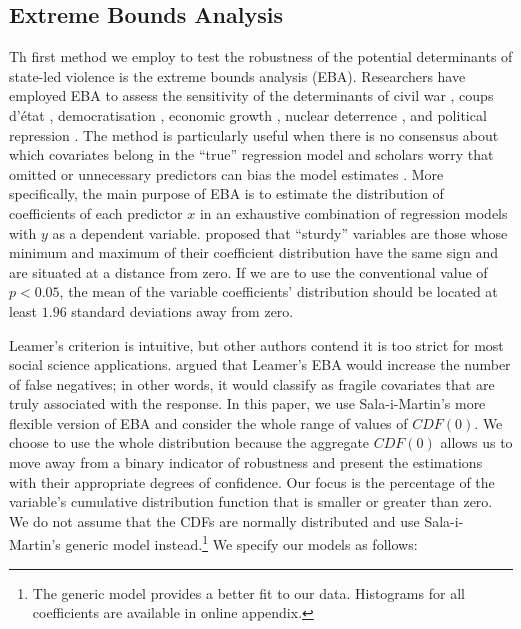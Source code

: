 \documentclass[a4paper,12pt]{article}
\begin{document}
\subsection{Extreme Bounds Analysis}
\label{subsec:eba}

Th first method we employ to test the robustness of the potential determinants of state-led violence is the extreme bounds analysis (EBA). Researchers have employed EBA to assess the sensitivity of the determinants of civil war \citep{hegre2006sensitivity}, coups d'état \citep{gassebner2016expect}, democratisation \citep{gassebner2013extreme}, economic growth \citep{levine1992sensitivity, sala1997just}, nuclear deterrence \citep{bell2015examining}, and political repression \citep{hafner2005right}. The method is particularly useful when there is no consensus about which covariates belong in the ``true'' regression model \citep[178]{sala1997just} and scholars worry that omitted or unnecessary predictors can bias the model estimates \citep[60]{angrist2008mostly, clarke2005phantom, elwert2014endogenous, spector2011methodological}. 
More specifically, the main purpose of EBA is to estimate the distribution of coefficients of each predictor $x$ in an exhaustive combination of regression models with $y$ as a dependent variable. \cite[308]{leamer1985sensitivity} proposed that ``sturdy'' variables are those whose minimum and maximum of their coefficient distribution have the same sign and are situated at a distance from zero. If we are to use the conventional value of $p < 0.05$, the mean of the variable coefficients' distribution should be located at least $1.96$ standard deviations away from zero. 
	
Leamer's criterion is intuitive, but other authors contend it is too strict for most social science applications. \cite{sala1997just} argued that Leamer's EBA would increase the number of false negatives; in other words, it would classify as fragile covariates that are truly associated with the response. In this paper, we use Sala-i-Martin's \citeyear{sala1997just} more flexible version of EBA and consider the whole range of values of $CDF(0)$. We choose to use the whole distribution because the aggregate $CDF(0)$ allows us to move away from a binary indicator of robustness and present the estimations with their appropriate degrees of confidence. Our focus is the percentage of the variable's cumulative distribution function that is smaller or greater than zero. We do not assume that the CDFs are normally distributed and use Sala-i-Martin's generic model instead.\footnote{The generic model provides a better fit to our data. Histograms for all coefficients are available in online appendix.} We specify our models as follows:
	
\end{document}
